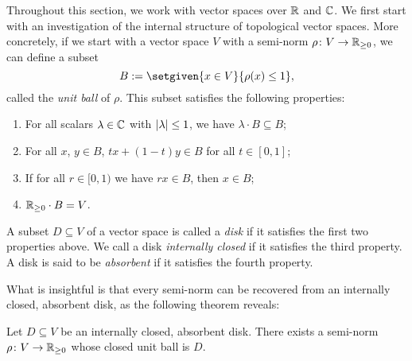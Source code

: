 
Throughout this section, we work with vector spaces over \(\mathbb R\) and \(\mathbb C\). We first start with an investigation of the internal structure of topological vector spaces. More concretely, if we start with a vector space \(V\) with a semi-norm \(\rho \colon V \to \mathbb R_{\geq 0}\), we can define a subset \[B \defeq \setgiven{x \in V}{\rho(x) \leq 1},\] called the \emph{unit ball} of \(\rho\). This subset satisfies the following properties:

\begin{enumerate}
    \item For all scalars \(\lambda \in \mathbb C\) with \(\lvert\lambda\rvert \leq 1\), we have \(\lambda \cdot B \subseteq B\);
    \item For all \(x\), \(y \in B\), \(tx + (1-t)y \in B\) for all \(t \in [0,1]\);
    \item If for all \(r \in [0,1)\) we have \(rx \in B\), then \(x \in B\);
    \item \(\mathbb R_{\geq 0} \cdot B = V\).
\end{enumerate}

\begin{definition}
    A subset \(D \subseteq V\) of a vector space is called a \emph{disk} if it satisfies the first two properties above. We call a disk \textit{internally closed} if it satisfies the third property. A disk is said to be \emph{absorbent} if it satisfies the fourth property. 
\end{definition}


What is insightful is that every semi-norm can be recovered from an internally closed, absorbent disk, as the following theorem reveals:

\begin{theorem}
   Let \(D \subseteq V\) be an internally closed, absorbent disk. There exists a semi-norm \(\rho \colon V \to \mathbb R_{\geq 0}\) whose closed unit ball is \(D\). 
\end{theorem}

